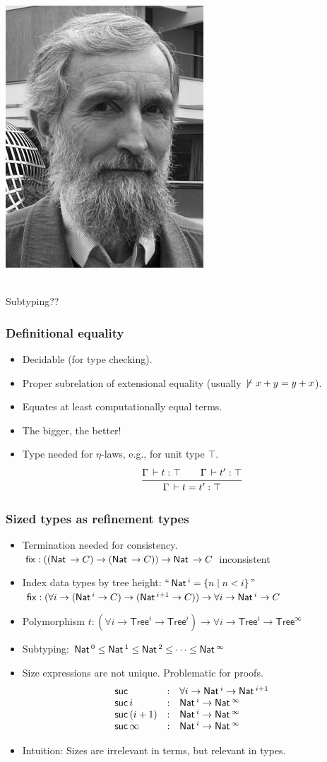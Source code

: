 \documentclass[t,fleqn]{beamer}
\makeatletter
\renewcommand{\ru}[2]{\dfrac{\begin{array}[b]{@{}c@{}} #1 \end{array}}{\begin{array}[t]{@{}l@{}} #2 \end{array}}}
\newcommand{\Tree}{\mathsf{Tree}}
\newcommand{\cAnn}{\color{red!80!black}}%
\renewcommand{\emph}[1]{{\cAnn#1}}
\newcommand{\mlsays}[1]{
\begin{frame}%
  \begin{minipage}[c]{0.5\linewidth}
   \includegraphics[height=0.9\textheight]{martin-loef-bw.png}
  \end{minipage}%
  \begin{minipage}[c]{0.5\linewidth}
   \begin{center}
     \bla \\[8ex]
     \Huge #1
   \end{center}
  \end{minipage}
\end{frame}
}
\makeatother
\begin{document}
\mlsays{Subtyping??}

\begin{frame}%
  \frametitle{Definitional equality}
  \vspace{-3ex}
  \begin{itemize}
  \item Decidable (for type checking).
  \item Proper subrelation of extensional equality (usually
    $\not\,\vdash x + y = y + x$).
  \item Equates at least computationally equal terms.
  \item The bigger, the better!
  \item Type needed for $\eta$-laws, e.g., for unit type $\top$.
\[
  \ru{\Gamma \der t : \top \qquad \Gamma \der t' : \top
    }{\Gamma \der t = t' : \top}
\]
\vspace{-2ex}
  \end{itemize}
\end{frame}




\begin{frame}%
  \frametitle{Sized types as refinement types}
  \vspace{-3ex}
  \begin{itemize}
  \item Termination needed for consistency.\\
    $\mathsf{fix} : ((\mathsf{Nat}\, \to C) \to (\mathsf{Nat}\, \to C)) \to \mathsf{Nat}\, \to C$
    inconsistent
  \item Index data types by tree height: ``$\mathsf{Nat}\,^i = \{ n \mid n < i \}$'' \\
    $\mathsf{fix} : (\forall i \to (\mathsf{Nat}\,^i \to C) \to (\mathsf{Nat}\,^{i+1} \to C))
    \to \forall i \to \mathsf{Nat}\,^i \to C$
  \item Polymorphism $t : (\forall i \to \Tree^i \to \Tree^i) \to
    \forall i \to \Tree^i \to \Tree^\infty$
  \item Subtyping: $\mathsf{Nat}\,^0 \leq \mathsf{Nat}\,^1 \leq \mathsf{Nat}\,^2 \leq \dots \leq
    \mathsf{Nat}\,^\infty$
  \item Size expressions are not unique.  Problematic for proofs.
\[
\begin{array}{lcl}
  \mathsf{suc}          & : & \forall i \to \mathsf{Nat}\,^i \to \mathsf{Nat}\,^{i + 1} \\
  \mathsf{suc}\,i       & : & \mathsf{Nat}\,^i \to \mathsf{Nat}\,^\infty \\
  \mathsf{suc}\,(i + 1) & : & \mathsf{Nat}\,^i \to \mathsf{Nat}\,^\infty \\
  \mathsf{suc}\,\infty  & : & \mathsf{Nat}\,^i \to \mathsf{Nat}\,^\infty \\
\end{array}
\]
\vspace{-2ex}
  \item Intuition: Sizes are \emph{irrelevant} in terms, but \emph{relevant} in types.
  \end{itemize}
\end{frame}
\end{document}
